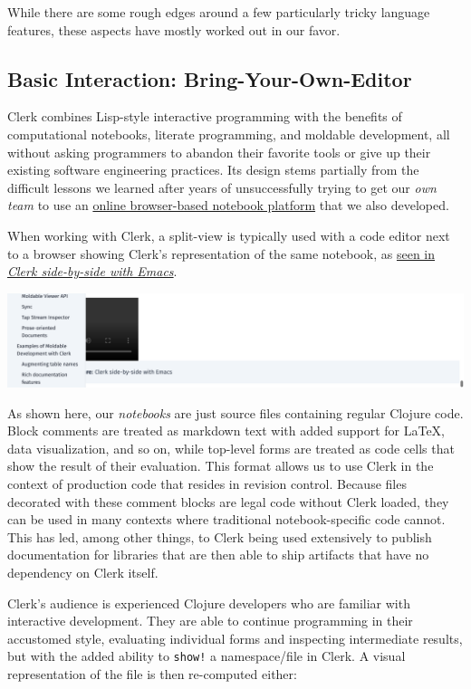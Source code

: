 \documentclass[sigconf,screen]{acmart}
\newcommand{\passthrough}[1]{#1}
\begin{document}
While there are some rough edges around a few particularly tricky language features, these aspects have mostly worked out in our favor.

\hypertarget{id}{%
\subsection{Basic Interaction: Bring-Your-Own-Editor}\label{id}}

Clerk combines Lisp-style interactive programming with the benefits of computational notebooks, literate programming, and moldable development, all without asking programmers to abandon their favorite tools or give up their existing software engineering practices. Its design stems partially from the difficult lessons we learned after years of unsuccessfully trying to get our \emph{own team} to use an \href{https://nextjournal.com}{online browser-based notebook platform} that we also developed.

When working with Clerk, a split-view is typically used with a code editor next to a browser showing Clerk's representation of the same notebook, as \protect\hyperlink{clerk-side-by-side-with-emacs}{seen in \emph{Clerk side-by-side with Emacs}}.

\includegraphics{images/result-anon-expr-5du3vXfuRiWkftn1YUvbdRb8nEVf8F.png}

As shown here, our \emph{notebooks} are just source files containing regular Clojure code. Block comments are treated as markdown text with added support for LaTeX, data visualization, and so on, while top-level forms are treated as code cells that show the result of their evaluation. This format allows us to use Clerk in the context of production code that resides in revision control. Because files decorated with these comment blocks are legal code without Clerk loaded, they can be used in many contexts where traditional notebook-specific code cannot. This has led, among other things, to Clerk being used extensively to publish documentation for libraries that are then able to ship artifacts that have no dependency on Clerk itself.

Clerk's audience is experienced Clojure developers who are familiar with interactive development. They are able to continue programming in their accustomed style, evaluating individual forms and inspecting intermediate results, but with the added ability to \passthrough{\lstinline"show!"} a namespace/file in Clerk. A visual representation of the file is then re-computed either:
\end{document}

